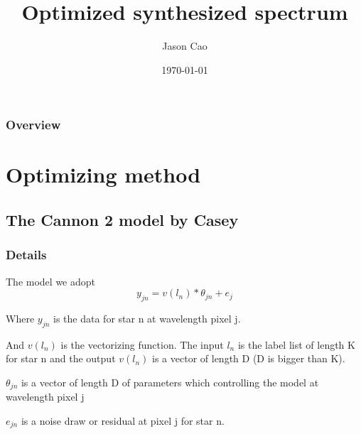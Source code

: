 \documentclass{beamer}
\title[]{Optimized synthesized spectrum} %
\author{Jason Cao} %
\institute[NYU] %
{
New York University \\ %
\medskip
\textit{jc6933@nyu.edu} %
}
\date{\today} %
\begin{document}
\begin{frame}
\titlepage %
\end{frame}

\begin{frame}
\frametitle{Overview} %
\tableofcontents %
\end{frame}


\section{Optimizing method} %

\subsection{The Cannon 2 model by Casey} %

\begin{frame}
\frametitle{Details}

The model we adopt
 \[y_{jn} = v(l_n) * \theta_{jn} + e_j \]
 
 Where \(y_{jn}\) is the data for star n at wavelength pixel j. 
 
And \(v(l_n)\) is the vectorizing function. 
The input \(l_n\) is the label list of length K for star n and the  output 
\(v(l_n)\) is a vector of length D (D is bigger than K).

\( \theta_{jn}\) is a vector of length D of parameters which controlling the model at wavelength pixel j

\( e_{jn}\) is a noise draw or residual at pixel j for star n.
 

\end{frame}
\end{document}
